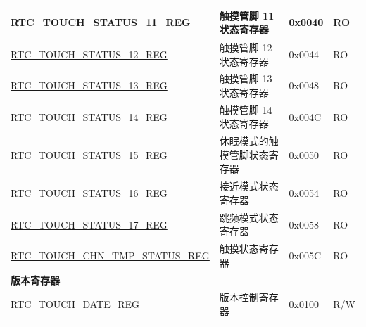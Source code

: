 \begin{longtable}{ | l | p{8cm} | p{1.3cm} | p{1.7cm} | }
\hyperref[regdesc:RTCTOUCHSTATUS0REG]{RTC\_TOUCH\_STATUS\_11\_REG} & 触摸管脚 11 状态寄存器 & 0x0040 & RO \\ \hline
\hyperref[regdesc:RTCTOUCHSTATUS0REG]{RTC\_TOUCH\_STATUS\_12\_REG} & 触摸管脚 12 状态寄存器 & 0x0044 & RO \\ \hline
\hyperref[regdesc:RTCTOUCHSTATUS0REG]{RTC\_TOUCH\_STATUS\_13\_REG} & 触摸管脚 13 状态寄存器 & 0x0048 & RO \\ \hline
\hyperref[regdesc:RTCTOUCHSTATUS0REG]{RTC\_TOUCH\_STATUS\_14\_REG} & 触摸管脚 14 状态寄存器 & 0x004C & RO \\ \hline
\hyperref[regdesc:RTCTOUCHSTATUS15REG]{RTC\_TOUCH\_STATUS\_15\_REG} & 休眠模式的触摸管脚状态寄存器 & 0x0050 & RO \\ \hline
\hyperref[regdesc:RTCTOUCHSTATUS16REG]{RTC\_TOUCH\_STATUS\_16\_REG} & 接近模式状态寄存器 & 0x0054 & RO \\ \hline
\hyperref[regdesc:RTCTOUCHSTATUS17REG]{RTC\_TOUCH\_STATUS\_17\_REG} & 跳频模式状态寄存器 & 0x0058 & RO \\ \hline
\hyperref[regdesc:RTCTOUCHCHNTMPSTATUSREG]{RTC\_TOUCH\_CHN\_TMP\_STATUS\_REG} & 触摸状态寄存器 & 0x005C & RO \\ \hline
\multicolumn{4}{|l|}{\textbf{版本寄存器}} \\ \hline
\hyperref[regdesc:RTCTOUCHDATEREG]{RTC\_TOUCH\_DATE\_REG} & 版本控制寄存器 & 0x0100 & R/W \\ \hline
\end{longtable}
